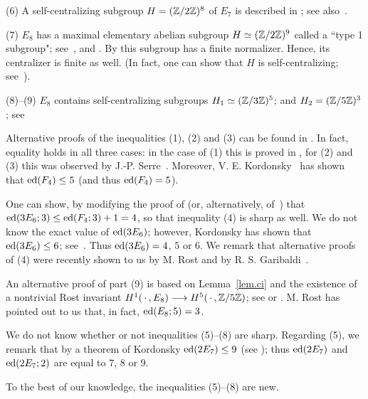 \begin{pf}
\smallskip
(6) A self-centralizing subgroup $H = ({\Bbb Z}/2{\Bbb Z})^8$ of $E_7$ 
is described in \cite[Theorem~9.8(ii)]{griess}; see also~\cite{cs}.

\smallskip
(7) $E_8$ has a maximal elementary abelian subgroup $H \simeq ({\Bbb Z}/2{\Bbb Z})^9$ 
called a ``type 1 subgroup"; see~\cite{adams}, \cite[(2.17)]{griess} 
and \cite{cs}. By \cite[(2.17)]{griess} this subgroup has a finite normalizer.
Hence, its centralizer is finite as well. (In fact, one can
show that $H$ is self-centralizing; see~\cite[p. 258]{griess}).

\smallskip
(8)--(9) $E_8$ contains self-centralizing subgroups 
$H_1 \simeq ({\Bbb Z}/3{\Bbb Z})^5$; 
and $H_2 = ({\Bbb Z}/5{\Bbb Z})^3$; see~\cite[(11.5) and (10.3)]{griess} 
\end{pf}

\begin{remark} \label{rem6.1-1}
Alternative proofs of the inequalities (1), (2) and (3)
can be found in \cite[12.14 and 12.15]{r2}. In fact, equality holds 
in all three cases: in the case of (1) this is proved 
in \cite{r2}, for (2) and (3) this was observed by 
J.-P. Serre~\cite{serrepc1}. Moreover,
V. E. Kordonsky~\cite{kordonsky} has shown that
$\operatorname{ed}(F_4) \leq 5$ (and thus $\operatorname{ed}(F_4) = 5$).

One can show, by modifying the proof of
\cite[Proposition 11.7]{r2} (or, alternatively, 
of~\cite[Theorem 9]{kordonsky}) that $\operatorname{ed}(3E_6; 3) \leq \operatorname{ed}(F_4; 3) + 1 = 4$,
so that inequality (4) is sharp as well.
We do not know the exact value of $\operatorname{ed}(3E_6)$; however, Kordonsky has 
shown that $\operatorname{ed}(3E_6) \leq 6$; see~\cite[Section 4.2]{kordonsky}.  
Thus $\operatorname{ed}(3E_6) = 4$, $5$ or $6$.
We remark that alternative proofs of (4) were recently 
shown to us by M. Rost 
and by R. S. Garibaldi~\cite{garibaldi}. 

An alternative proof of part (9) is based on Lemma~\ref{lem.ci} and
the existence of a nontrivial Rost invariant
$H^1(\, \cdot \,, E_8) \longrightarrow H^5(\, \cdot \,, {\Bbb Z}/5{\Bbb Z})$;
see \cite[7.3]{serrepp} or \cite[(31.40) and (31.47)]{boi}. 
M. Rost has pointed out to us that, in fact, $\operatorname{ed}(E_8; 5) = 3$.

We do not know whether or not inequalities (5)--(8) are sharp.
Regarding (5), we remark that by a theorem of Kordonsky $\operatorname{ed}(2E_7) \leq 9$ 
(see \cite[Theorem 10]{kordonsky}); thus $\operatorname{ed}(2E_7)$ and $\operatorname{ed}(2E_7; 2)$ 
are equal to $7$, $8$ or $9$.

To the best of our knowledge, the inequalities (5)--(8) are new. 
\end{remark}

